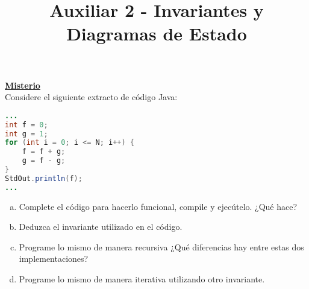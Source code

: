 \documentclass[dcc,uchile]{fcfmcourse}
\title{Auxiliar 2 - Invariantes y Diagramas de Estado}
\begin{document}
\maketitle

\vspace{-1ex}


\begin{problems}
\problem \underline{\textbf{Misterio}}\\
Considere el siguiente extracto de código Java:
\begin{lstlisting}[language=Java, frame=single]
...
int f = 0;
int g = 1;
for (int i = 0; i <= N; i++) {
    f = f + g;
    g = f - g;
}
StdOut.println(f);
...
\end{lstlisting}

\begin{enumerate}[a)]
    \item Complete el código para hacerlo funcional, compile y ejecútelo. ¿Qué hace?
    \item Deduzca el invariante utilizado en el código.
    \item Programe lo mismo de manera recursiva ¿Qué diferencias hay entre estas dos implementaciones? %
    \item Programe lo mismo de manera iterativa utilizando otro invariante.
\end{enumerate}


\end{problems}
\end{document}
